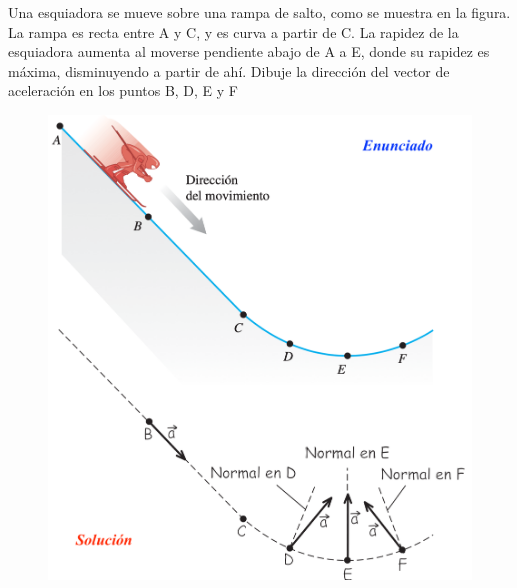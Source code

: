 \vspace{10mm} %
\begin{prob}
Una esquiadora se mueve sobre una rampa de salto, como se muestra en la figura. La rampa es recta entre A y C, y es curva a partir de C. La rapidez de la esquiadora aumenta al moverse pendiente abajo de A a E, donde su rapidez es máxima, disminuyendo a partir de ahí. Dibuje la dirección del vector de aceleración en los puntos B, D, E y F	
\end{prob}
\begin{figure}[H]
		\centering
		\includegraphics[width=1\textwidth]{imagenes/imagenes02/T02IM16.png}
		\end{figure}

\vspace{30mm} %

